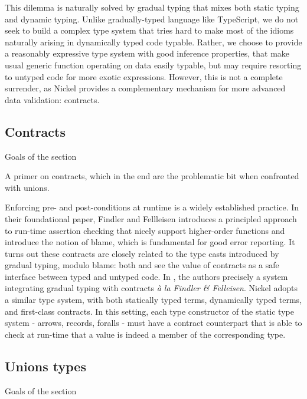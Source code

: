 \documentclass{article}
\begin{document}
This dilemma is naturally solved by gradual typing\cite{Siek06gradualtyping}
that mixes both static typing and dynamic typing. Unlike gradually-typed
language like TypeScript, we do not seek to build a complex type system that
tries hard to make most of the idioms naturally arising in dynamically typed
code typable. Rather, we choose to provide a reasonably expressive type system
with good inference properties, that make usual generic function operating on
data easily typable, but may require resorting to untyped code for more exotic
expressions.  However, this is not a complete surrender, as Nickel provides a
complementary mechanism for more advanced data validation: contracts.

\subsection{Contracts}
\color{red}Goals of the section

A primer on contracts, which in the end are the problematic bit when confronted
with unions.\vspace{0.5cm}

Enforcing pre- and post-conditions at runtime is a widely established practice.
In their foundational paper\cite{FindlerFelleisenHOContracts}, Findler and
Fellleisen introduces a principled approach to run-time assertion checking that
nicely support higher-order functions and introduce the notion of blame, which
is fundamental for good error reporting. It turns out these contracts are
closely related to the type casts introduced by gradual typing, modulo blame:
both \cite{FindlerMultiLang} and \cite{FelleisenInterLang} see the value of
contracts as a safe interface between typed and untyped code. In
\cite{WellTypedBlamed}, the authors precisely a system integrating gradual
typing with contracts \textit{à la Findler \& Felleisen}. Nickel adopts a
similar type system, with both statically typed terms, dynamically typed terms,
and first-class contracts. In this setting, each type constructor of the static
type system - arrows, records, foralls - must have a contract counterpart that
is able to check at run-time that a value is indeed a member of the
corresponding type.

\color{black}


\subsection{Unions types}
\color{red}Goals of the section
\end{document}
